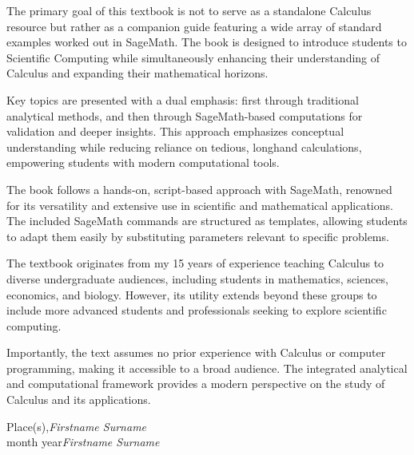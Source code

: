 %
%

\preface

The primary goal of this textbook is not to serve as a standalone Calculus resource but rather as a companion guide featuring a wide array of standard examples worked out in SageMath. The book is designed to introduce students to Scientific Computing while simultaneously enhancing their understanding of Calculus and expanding their mathematical horizons.
 
Key topics are presented with a dual emphasis: first through traditional analytical methods, and then through SageMath-based computations for validation and deeper insights. This approach emphasizes conceptual understanding while reducing reliance on tedious, longhand calculations, empowering students with modern computational tools.
 
The book follows a hands-on, script-based approach with SageMath, renowned for its versatility and extensive use in scientific and mathematical applications. The included SageMath commands are structured as templates, allowing students to adapt them easily by substituting parameters relevant to specific problems.
 
The textbook originates from my 15 years of experience teaching Calculus to diverse undergraduate audiences, including students in mathematics, sciences, economics, and biology. However, its utility extends beyond these groups to include more advanced students and professionals seeking to explore scientific computing.
 
Importantly, the text assumes no prior experience with Calculus or computer programming, making it accessible to a broad audience. The integrated analytical and computational framework provides a modern perspective on the study of Calculus and its applications.
 
 

\vspace{\baselineskip}
\begin{flushright}\noindent
Place(s),\hfill {\it Firstname  Surname}\\
month year\hfill {\it Firstname  Surname}\\
\end{flushright}


